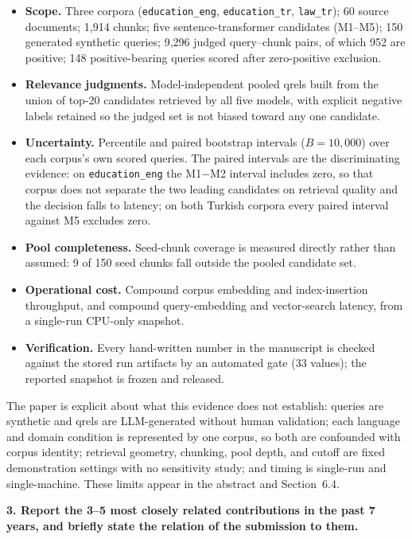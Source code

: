 \documentclass[10pt,a4paper]{article}
\newcommand{\q}[1]{\medskip\noindent\textbf{#1}\par\nopagebreak}
\begin{document}
\begin{itemize}
  \item \textbf{Scope.} Three corpora (\texttt{education\_eng}, \texttt{education\_tr},
        \texttt{law\_tr}); 60 source documents; 1{,}914 chunks; five sentence-transformer
        candidates (M1--M5); 150 generated synthetic queries; 9{,}296 judged query--chunk
        pairs, of which 952 are positive; 148 positive-bearing queries scored after
        zero-positive exclusion.
  \item \textbf{Relevance judgments.} Model-independent pooled qrels built from the union of
        top-20 candidates retrieved by all five models, with explicit negative labels retained
        so the judged set is not biased toward any one candidate.
  \item \textbf{Uncertainty.} Percentile and paired bootstrap intervals
        ($B = 10{,}000$) over each corpus's own scored queries. The paired intervals are the
        discriminating evidence: on \texttt{education\_eng} the M1$-$M2 interval includes zero,
        so that corpus does not separate the two leading candidates on retrieval quality and
        the decision falls to latency; on both Turkish corpora every paired interval against
        M5 excludes zero.
  \item \textbf{Pool completeness.} Seed-chunk coverage is measured directly rather than
        assumed: 9 of 150 seed chunks fall outside the pooled candidate set.
  \item \textbf{Operational cost.} Compound corpus embedding and index-insertion throughput,
        and compound query-embedding and vector-search latency, from a single-run CPU-only
        snapshot.
  \item \textbf{Verification.} Every hand-written number in the manuscript is checked against
        the stored run artifacts by an automated gate (33 values); the reported snapshot is
        frozen and released.
\end{itemize}

The paper is explicit about what this evidence does not establish: queries are synthetic and
qrels are LLM-generated without human validation; each language and domain condition is
represented by one corpus, so both are confounded with corpus identity; retrieval geometry,
chunking, pool depth, and cutoff are fixed demonstration settings with no sensitivity study; and
timing is single-run and single-machine. These limits appear in the abstract and Section~6.4.

\q{3. Report the 3--5 most closely related contributions in the past 7 years, and briefly state
the relation of the submission to them.}
\end{document}
